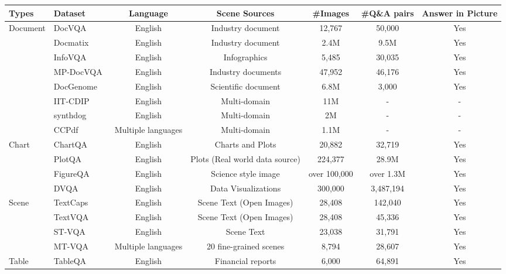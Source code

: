 \scriptsize
    \begin{tabular}{llccccc}
    \toprule
    Types & Dataset & Language & Scene Sources & \#Images & \#Q\&A pairs & Answer in Picture \\
    \midrule
    \multirow{4}{*}{Document} & DocVQA~\cite{mathew2021docvqa} & English & Industry document & 12,767&  50,000 & Yes\\
    & Docmatix~\cite{laurenccon2024building} & English & Industry document & 2.4M & 9.5M & Yes\\
    & InfoVQA~\cite{mathew2022infographicvqa} & English & Infographics & 5,485 & 30,035 & Yes\\
    & MP-DocVQA~\cite{tito2023hierarchical} & English & Industry documents & 47,952 & 46,176 & Yes\\
    &DocGenome~\cite{xia2024docgenome} & English & Scientific document & 6.8M & 3,000 & Yes\\
    &IIT-CDIP~\cite{xu2020layoutlm} & English & Multi-domain & 11M & - & -\\
    &synthdog~\cite{kim2022ocr}& English & Multi-domain & 2M & - & -\\
    &CCPdf~\cite{turski2023ccpdf}& Multiple languages & Multi-domain & 1.1M & - & - \\
    \midrule 
    \multirow{4}{*}{Chart }& ChartQA~\cite{masry2022chartqa} & English & Charts and Plots  & 20,882 & 32,719 & Yes\\
    & PlotQA~\cite{methani2020plotqa} & English & Plots (Real world data source) & 224,377 & 28.9M & Yes\\
    & FigureQA~\cite{kahou2017figureqa} & English & Science style image & over 100,000 & over 1.3M& Yes\\
    & DVQA~\cite{kafle2018dvqa} & English & Data Visualizations & 300,000 & 3,487,194 & Yes\\
    \midrule 
    \multirow{4}{*}{Scene} & TextCaps~\cite{sidorov2020textcaps} & English & Scene Text (Open Images) & 28,408 & 142,040 & Yes\\
    & TextVQA~\cite{singh2019towards} & English & Scene Text (Open Images) & 28,408 & 45,336 & Yes\\
    & ST-VQA~\cite{biten2019scene} & English & Scene Text & 23,038 & 31,791 & Yes\\
    & MT-VQA~\cite{wen2024mt} & Multiple languages & 20 fine-grained scenes & 8,794 & 28,607 & Yes\\
    \midrule 
    \multirow{1}{*}{Table} & TableQA~\cite{sun2020tableqa} & English & Financial reports & 6,000 & 64,891 & Yes\\

\end{tabular}

